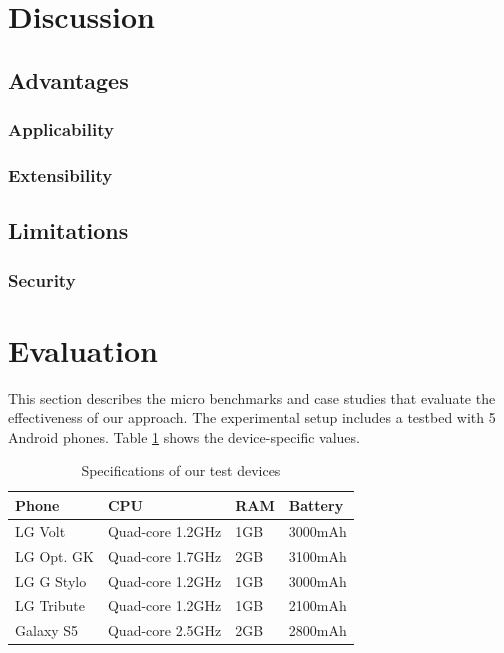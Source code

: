 \documentclass{sig-alternate}[10pt]
\begin{document}
\section{Discussion}
\subsection{Advantages}
\subsubsection{Applicability}
\subsubsection{Extensibility}

\subsection{Limitations}
\subsubsection{Security}


\section{Evaluation}
\label{sec:eval}
This section describes the micro benchmarks and case studies that evaluate the effectiveness of our approach. The experimental setup includes a testbed with 5 Android phones. Table \ref{table:devices} shows the device-specific values.

\begin{table}[h]
\caption{Specifications of our test devices}
\label{table:devices}
\centering \small
\begin{tabular}{| l | l | l | l |}
    \hline
    Phone & CPU & RAM & Battery \\ \hline
    LG Volt & Quad-core 1.2GHz & 1GB & 3000mAh\\ \hline
		LG Opt. GK & Quad-core 1.7GHz & 2GB & 3100mAh\\ \hline
		LG G Stylo & Quad-core 1.2GHz & 1GB & 3000mAh\\ \hline
		LG Tribute & Quad-core 1.2GHz & 1GB & 2100mAh\\ \hline
		Galaxy S5 & Quad-core 2.5GHz & 2GB & 2800mAh\\ \hline
\end{tabular}
\end{table}
\end{document}
